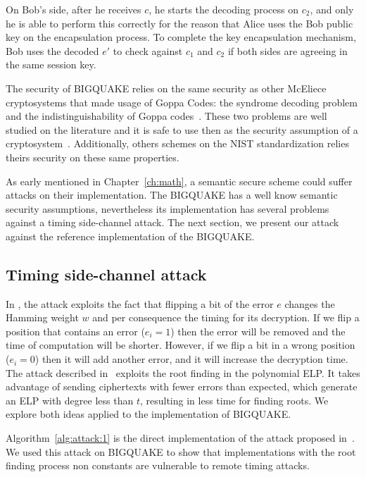 On Bob's side, after he receives $c$, he starts the decoding process on $c_2$, and only he is able to perform this correctly for the reason that Alice uses the Bob public key on the encapsulation process. To complete the key encapsulation mechanism, Bob uses the decoded $e'$ to check against $c_1$ and $c_2$ if both sides are agreeing in the same session key.

The security of BIGQUAKE relies on the same security as other McEliece cryptosystems that made usage of Goppa Codes: the syndrome decoding problem and the indistinguishability of Goppa codes~\cite{bardet2017big}. These two problems are well studied on the literature and it is safe to use then as the security assumption of a cryptosystem~\cite{bernstein2008attacking, faugere2013distinguisher}. Additionally, others schemes on the NIST standardization relies theirs security on these same properties\cite{bernstein2017classic}.

As early mentioned in Chapter~\ref{ch:math}, a semantic secure scheme could suffer attacks on their implementation. The BIGQUAKE has a well know semantic security assumptions, nevertheless its implementation has several problems against a timing side-channel attack. The next section, we present our attack against the reference implementation of the BIGQUAKE. 

\subsection{Timing side-channel attack}
In \cite{shoufan2009timing}, the attack exploits the fact that flipping a bit of the error $e$ changes the Hamming weight $w$ and per consequence the timing for its decryption. If we flip a position that contains an error ($e_i = 1$) then the error will be removed and the time of computation will be shorter. However, if we flip a bit in a wrong position ($e_i = 0$) then it will add another error, and it will increase the decryption time. The attack described in~\cite{bucerzan2017improved} exploits the root finding in the polynomial ELP. It takes advantage of sending ciphertexts with fewer errors than expected, which generate an ELP with degree less than $t$, resulting in less time for finding roots. We explore both ideas applied to the implementation of BIGQUAKE.

Algorithm~\ref{alg:attack:1} is the direct implementation of the attack proposed in~\cite{shoufan2009timing}. We used this attack on BIGQUAKE to show that implementations with the root finding process non constants are vulnerable to remote timing attacks.

